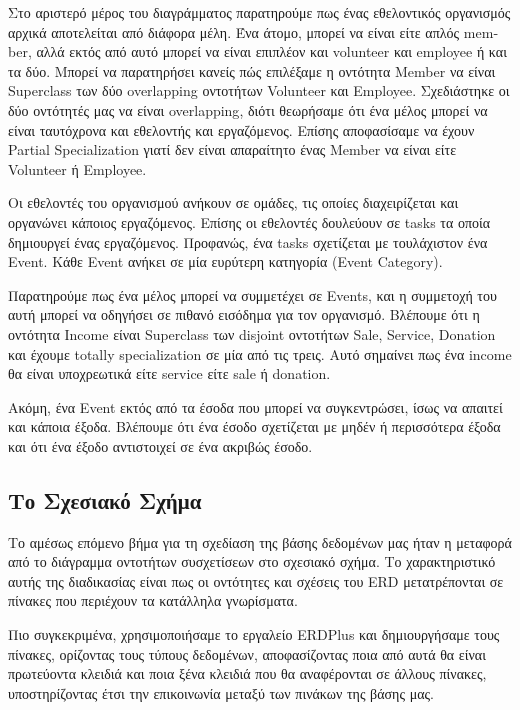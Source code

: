 \documentclass[manuscript,screen,review]{acmart}
\newcommand{\en}[1]{\foreignlanguage{english}{#1}}
\begin{document}
Στο αριστερό μέρος του διαγράμματος παρατηρούμε πως ένας εθελοντικός οργανισμός αρχικά αποτελείται από διάφορα μέλη. Ένα άτομο, μπορεί να είναι είτε απλός \en{member}, αλλά εκτός από αυτό μπορεί να είναι επιπλέον και \en{volunteer} και \en{employee} ή και τα δύο. Μπορεί να παρατηρήσει κανείς πώς επιλέξαμε η οντότητα \en{Member} να είναι \en{Superclass} των δύο  \en{overlapping} οντοτήτων \en{Volunteer} και \en{Employee}. Σχεδιάστηκε οι δύο οντότητές μας να είναι \en{overlapping}, διότι θεωρήσαμε ότι ένα μέλος μπορεί να είναι ταυτόχρονα και εθελοντής και εργαζόμενος. Επίσης αποφασίσαμε να έχουν \en{Partial Specialization} γιατί δεν είναι απαραίτητο ένας \en{Member} να είναι είτε \en{Volunteer } ή \en{Employee}.

Οι εθελοντές του οργανισμού ανήκουν σε ομάδες, τις οποίες διαχειρίζεται και οργανώνει κάποιος εργαζόμενος. Επίσης οι εθελοντές δουλεύουν σε \en{tasks} τα οποία δημιουργεί ένας εργαζόμενος.
Προφανώς, ένα \en{tasks} σχετίζεται με τουλάχιστον ένα \en{Event}. Κάθε \en{Event} ανήκει σε μία ευρύτερη κατηγορία (\en{Event Category}).

Παρατηρούμε πως ένα μέλος μπορεί να συμμετέχει σε \en{Events}, και η συμμετοχή του αυτή μπορεί να οδηγήσει σε πιθανό εισόδημα για τον οργανισμό. Βλέπουμε ότι η οντότητα \en{Income} είναι \en{Superclass} των \en{disjoint} οντοτήτων \en{Sale, Service, Donation} και έχουμε \en{totally specialization} σε μία από τις τρεις. Αυτό σημαίνει πως ένα \en{income} θα είναι υποχρεωτικά είτε \en{service} είτε \en{sale} ή \en{donation}.

Ακόμη, ένα \en{Event} εκτός από τα έσοδα που μπορεί να συγκεντρώσει, ίσως να απαιτεί και κάποια έξοδα. Βλέπουμε ότι ένα έσοδο σχετίζεται με μηδέν ή περισσότερα έξοδα και ότι ένα έξοδο αντιστοιχεί σε ένα ακριβώς έσοδο.

\subsection{Το Σχεσιακό Σχήμα}

Το αμέσως επόμενο βήμα για τη σχεδίαση της βάσης δεδομένων μας ήταν η μεταφορά από το διάγραμμα οντοτήτων συσχετίσεων στο σχεσιακό σχήμα. Το χαρακτηριστικό αυτής της διαδικασίας είναι πως οι οντότητες και σχέσεις του \en{ERD} μετατρέπονται σε πίνακες που περιέχουν τα κατάλληλα γνωρίσματα.



Πιο συγκεκριμένα, χρησιμοποιήσαμε το εργαλείο \en{ERDPlus} και δημιουργήσαμε τους πίνακες, ορίζοντας τους τύπους δεδομένων, αποφασίζοντας ποια από αυτά θα είναι πρωτεύοντα κλειδιά και ποια 
ξένα κλειδιά που θα αναφέρονται σε άλλους πίνακες, υποστηρίζοντας έτσι την επικοινωνία μεταξύ των πινάκων της βάσης μας. 
\end{document}
